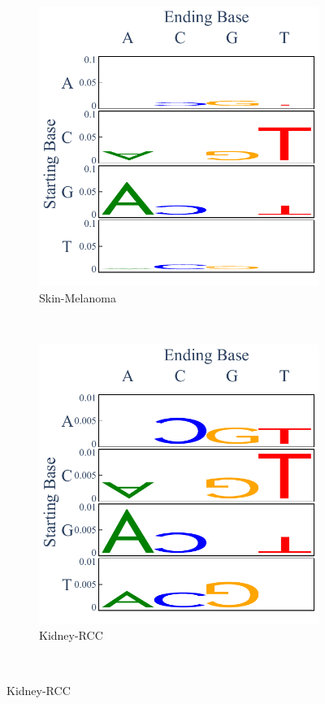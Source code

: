\begin{figure}[ht!]
    \begin{subfigure}{.5\textwidth}
    \includegraphics[scale=0.7]{graphics/spectra_Skin-Melanoma.pdf}
    \caption{Skin-Melanoma}
    \label{fig:spectra_skin}
    \end{subfigure}
    ~
    \begin{subfigure}{.5\textwidth}
    
    \includegraphics[scale=0.7]{graphics/spectra_Kidney-RCC.pdf}
    \caption{Kidney-RCC}
    \label{fig:spectra_kidney}
    \end{subfigure} \\
    \vspace{0.5cm}
    

\end{figure}
